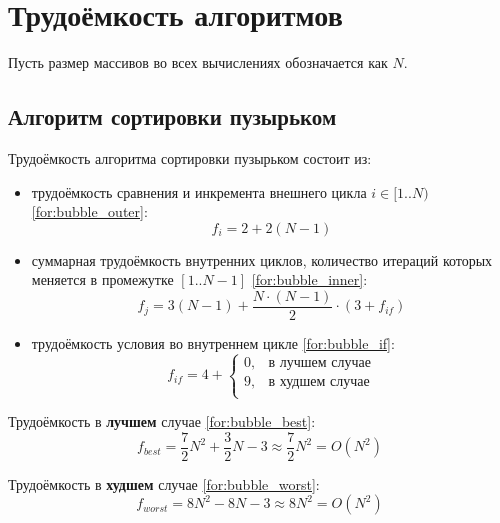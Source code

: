 \section{Трудоёмкость алгоритмов}

Пусть размер массивов во всех вычислениях обозначается как $N$.

\subsection{Алгоритм сортировки пузырьком}

Трудоёмкость алгоритма сортировки пузырьком состоит из:
\begin{itemize}
    \item трудоёмкость сравнения и инкремента внешнего цикла $i \in [1..N)$ \eqref{for:bubble_outer}:
    \begin{equation}
        \label{for:bubble_outer}
        f_{i} = 2 + 2(N - 1)
    \end{equation}
    \item суммарная трудоёмкость внутренних циклов, количество итераций которых меняется в промежутке $[1..N-1]$ \eqref{for:bubble_inner}:
    \begin{equation}
        \label{for:bubble_inner}
        f_{j} = 3(N - 1) + \frac{N \cdot (N - 1)}{2} \cdot (3 + f_{if})
    \end{equation}
    \item трудоёмкость условия во внутреннем цикле \eqref{for:bubble_if}:
    \begin{equation}
        \label{for:bubble_if}
        f_{if} = 4 + \begin{cases}
                         0, & \text{в лучшем случае}\\
                         9, & \text{в худшем случае}\\
        \end{cases}
    \end{equation}
\end{itemize}

Трудоёмкость в \textbf{лучшем} случае \eqref{for:bubble_best}:
\begin{equation}
    \label{for:bubble_best}
    f_{best} = \frac{7}{2} N^2 + \frac{3}{2} N - 3 \approx \frac{7}{2} N^2 = O(N^2)
\end{equation}

Трудоёмкость в \textbf{худшем} случае \eqref{for:bubble_worst}:
\begin{equation}
    \label{for:bubble_worst}
    f_{worst} =  8N^2 - 8N - 3 \approx 8N^2 = O(N^2)
\end{equation}

